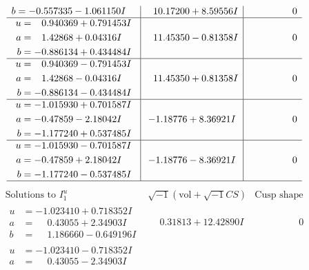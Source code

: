 \documentclass[1p]{elsarticle_modified}
\theoremstyle{definition}
\newcommand{\I}{\sqrt{-1}}
\begin{document}
$$\begin{array}{c|c|c}
\begin{aligned}
b &= -0.557335 - 1.061150 I\end{aligned}
 & \phantom{-}10.17200 + 8.59556 I & \phantom{-0.000000 } 0 \\ \hline\begin{aligned}
u &= \phantom{-}0.940369 + 0.791453 I \\
a &= \phantom{-}1.42868 + 0.04316 I \\
b &= -0.886134 + 0.434484 I\end{aligned}
 & \phantom{-}11.45350 - 0.81358 I & \phantom{-0.000000 } 0 \\ \hline\begin{aligned}
u &= \phantom{-}0.940369 - 0.791453 I \\
a &= \phantom{-}1.42868 - 0.04316 I \\
b &= -0.886134 - 0.434484 I\end{aligned}
 & \phantom{-}11.45350 + 0.81358 I & \phantom{-0.000000 } 0 \\ \hline\begin{aligned}
u &= -1.015930 + 0.701587 I \\
a &= -0.47859 - 2.18042 I \\
b &= -1.177240 + 0.537485 I\end{aligned}
 & -1.18776 + 8.36921 I & \phantom{-0.000000 } 0 \\ \hline\begin{aligned}
u &= -1.015930 - 0.701587 I \\
a &= -0.47859 + 2.18042 I \\
b &= -1.177240 - 0.537485 I\end{aligned}
 & -1.18776 - 8.36921 I & \phantom{-0.000000 } 0\\
 \hline 
 \end{array}$$\newpage$$\begin{array}{c|c|c}  
\text{Solutions to }I^u_{1}& \I (\text{vol} + \sqrt{-1}CS) & \text{Cusp shape}\\
 \hline 
\begin{aligned}
u &= -1.023410 + 0.718352 I \\
a &= \phantom{-}0.43055 + 2.34903 I \\
b &= \phantom{-}1.186660 - 0.649196 I\end{aligned}
 & \phantom{-}0.31813 + 12.42890 I & \phantom{-0.000000 } 0 \\ \hline\begin{aligned}
u &= -1.023410 - 0.718352 I \\
a &= \phantom{-}0.43055 - 2.34903 I \\

\end{aligned}
\end{array}$$
\end{document}
